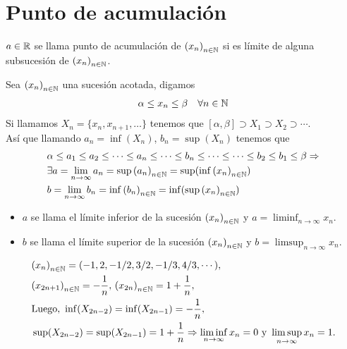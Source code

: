 \section{Punto de acumulación}

\begin{definition}
  \(a \in \mathbb{R} \) se llama punto de acumulación de \({(x_n)}_{n \in \mathbb{N}} \) si es límite de alguna subsucesión de \({(x_n)}_{n \in \mathbb{N}} \).
\end{definition}

\begin{definition}
  Sea \({(x_n)}_{n \in \mathbb{N}} \) una sucesión acotada, digamos\begin{align*}
    \alpha \leq x_n \leq \beta \quad \forall n \in \mathbb{N}
  \end{align*}
  Si llamamos \(X_n = \{ x_n, x_{n+1}, \ldots \} \) tenemos que \([\alpha, \beta] \supset X_1 \supset X_2 \supset \cdots \). \\
  Así que llamando \(a_n = \inf(X_n)\), \(b_n = \sup(X_n)\) tenemos que \begin{align*}
     & \alpha \leq a_1 \leq a_2 \leq \cdots \leq a_n \leq \cdots \leq b_n \leq \cdots \leq \cdots \leq b_2 \leq b_1 \leq \beta \Rightarrow \\
     & \exists a = \lim_{n \to \infty} a_n = \sup{(a_n)}_{n \in \mathbb{N}} = \sup(\inf{(x_n)}_{n \in \mathbb{N}})                                         \\
     & b = \lim_{n \to \infty} b_n = \inf{(b_n)}_{n \in \mathbb{N}} = \inf(\sup{(x_n)}_{n \in \mathbb{N}})
  \end{align*}
  \begin{itemize}
    \item \( a \) se llama el límite inferior de la sucesión \({(x_n)}_{n \in \mathbb{N}} \) y \(a = \liminf_{n \to \infty} x_n\).
    \item  \(b\) se llama el límite superior de la sucesión \({(x_n)}_{n \in \mathbb{N}} \) y \(b = \limsup_{n \to \infty} x_n\).
  \end{itemize}
\end{definition}

\begin{eg}
  \begin{align*}
     & {(x_n)}_{n \in \mathbb{N}} = (-1, 2, -1/2, 3/2, -1/3, 4/3, \cdots),                                                                             \\
     & {(x_{2n+1})}_{n \in \mathbb{N}} = -\frac{1}{n}, \, {(x_{2n})}_{n \in \mathbb{N}} = 1 + \frac{1}{n},                                                     \\
     & \text{Luego, } \inf(X_{2n-2}) = \inf(X_{2n-1}) = -\frac{1}{n},                                                                          \\
     & \sup(X_{2n-2}) = \sup(X_{2n-1}) = 1 + \frac{1}{n} \Rightarrow \liminf_{n \to \infty} x_n = 0 \text{ y } \limsup_{n \to \infty} x_n = 1.
  \end{align*}
\end{eg}